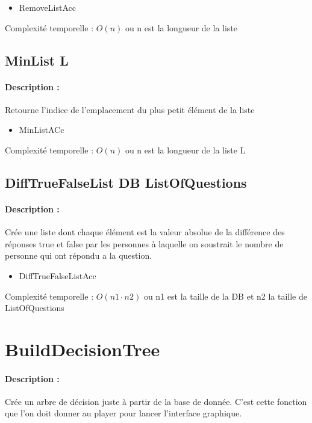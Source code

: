 \documentclass[10pt,a4paper]{article}
\begin{document}
\begin{itemize}
\item RemoveListAcc
\end{itemize}

Complexité temporelle : $O(n)$ ou n est la longueur de la liste 

\subsection{MinList L}
\paragraph{Description :} Retourne l'indice de l'emplacement du plus petit élément de la liste

\begin{itemize}
\item MinListACc
\end{itemize}

Complexité temporelle : $O(n)$ ou n est la longueur de la liste L

\subsection{DiffTrueFalseList DB ListOfQuestions}
\paragraph{Description :} Crée une liste dont chaque élément est la valeur absolue de la différence des réponses true et false par les personnes à laquelle on soustrait le nombre de personne qui ont répondu a la question.

\begin{itemize}
\item DiffTrueFalseListAcc
\end{itemize}

Complexité temporelle : $O(n1 \cdot n2)$ ou n1 est la taille de la DB et n2 la taille de ListOfQuestions

\section{BuildDecisionTree}
\paragraph{Description :} Crée un arbre de décision juste à partir de la base de donnée. C'est cette fonction que l'on doit donner  au player pour lancer l'interface graphique.
\end{document}
